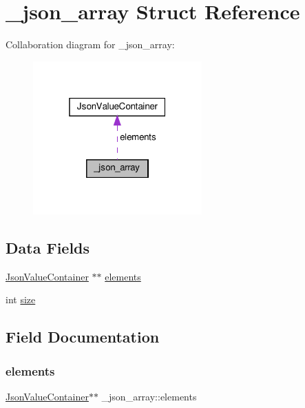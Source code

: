 \hypertarget{struct__json__array}{}\section{\+\_\+json\+\_\+array Struct Reference}
\label{struct__json__array}


Collaboration diagram for \+\_\+json\+\_\+array\+:\nopagebreak
\begin{figure}[H]
\begin{center}
\leavevmode
\includegraphics[width=184pt]{struct__json__array__coll__graph}
\end{center}
\end{figure}
\subsection*{Data Fields}
\begin{DoxyCompactItemize}
\item 
\hyperlink{structJsonValueContainer}{Json\+Value\+Container} $\ast$$\ast$ \hyperlink{struct__json__array_a8ca54d1e67425573f05976a454a07fd5}{elements}
\item 
int \hyperlink{struct__json__array_a94e78470cab37adc7200c745981e917f}{size}
\end{DoxyCompactItemize}


\subsection{Field Documentation}
\mbox{\label{struct__json__array_a8ca54d1e67425573f05976a454a07fd5}} 
\subsubsection{\texorpdfstring{elements}{elements}}
{\footnotesize\ttfamily \hyperlink{structJsonValueContainer}{Json\+Value\+Container}$\ast$$\ast$ \+\_\+json\+\_\+array\+::elements}

